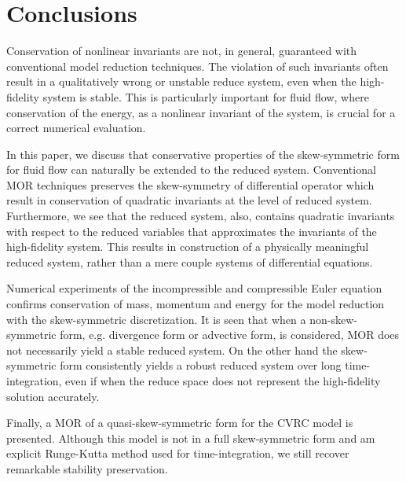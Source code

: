 \section{Conclusions} \label{sec:con}

Conservation of nonlinear invariants are not, in general, guaranteed with conventional model reduction techniques. The violation of such invariants often result in a qualitatively wrong or unstable reduce system, even when the high-fidelity system is stable. This is particularly important for fluid flow, where conservation of the energy, as a nonlinear invariant of the system, is crucial for a correct numerical evaluation.

In this paper, we discuss that conservative properties of the skew-symmetric form for fluid flow can naturally be extended to the reduced system. Conventional MOR techniques preserves the skew-symmetry of differential operator which result in conservation of quadratic invariants at the level of reduced system. Furthermore, we see that the reduced system, also, contains quadratic invariants with respect to the reduced variables that approximates the invariants of the high-fidelity system. This results in construction of a physically meaningful reduced system, rather than a mere couple systems of differential equations.

Numerical experiments of the incompressible and compressible Euler equation confirms conservation of mass, momentum and energy for the model reduction with the skew-symmetric discretization. It is seen that when a non-skew-symmetric form, e.g. divergence form or advective form, is considered, MOR does not necessarily yield a stable reduced system. On the other hand the skew-symmetric form consistently yields a robust reduced system over long time-integration, even if when the reduce space does not represent the high-fidelity solution accurately. 

Finally, a MOR of a quasi-skew-symmetric form for the CVRC model is presented. Although this model is not in a full skew-symmetric form and am explicit Runge-Kutta method used for time-integration, we still recover remarkable stability preservation. 
